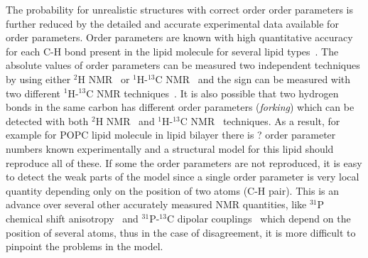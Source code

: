 \documentclass[aps,prl,superscriptaddress,twocolumn]{revtex4}
\begin{document}
The probability for unrealistic structures with correct order order parameters is further reduced by
the detailed and accurate experimental data available for order parameters.
Order parameters are known with high quantitative accuracy for each C-H bond present in the lipid molecule
for several lipid types~\cite{leftin11,marsh13,dvinskikh05a,ferreira13,leftin13,leftin14,botan15}. 
The absolute values of order parameters can be measured two independent
techniques by using either $^2$H NMR~\cite{seelig77c} or $^1$H-$^{13}$C NMR~\cite{hong95a,gross97,dvinskikh05a,ferreira13} and
the sign can be measured with two different $^1$H-$^{13}$C NMR techniques~\cite{hong95a,hong95b,gross97}.
It is also possible that two hydrogen bonds in the same carbon has different order parameters ({\it forking})
which can be detected with both $^2$H NMR~\cite{seelig75,gally81,engel81} and $^1$H-$^{13}$C NMR~\cite{??} techniques.
As a result, for example for POPC lipid molecule in lipid bilayer there is ? order parameter numbers
known experimentally and a structural model for this lipid should reproduce all of these.
If some the order parameters are not reproduced, it is easy to detect the weak parts of the model
since a single order parameter is very local quantity depending only on the position of two atoms (C-H pair).
This is an advance over several other accurately measured NMR quantities, 
like $^{31}$P chemical shift anisotropy~\cite{chowdhary13} and $^{31}$P-$^{13}$C dipolar couplings~\cite{prakash10}
which depend on the position of several atoms, thus in the case of disagreement, it is more difficult 
to pinpoint the problems in the model.








 
\end{document}
